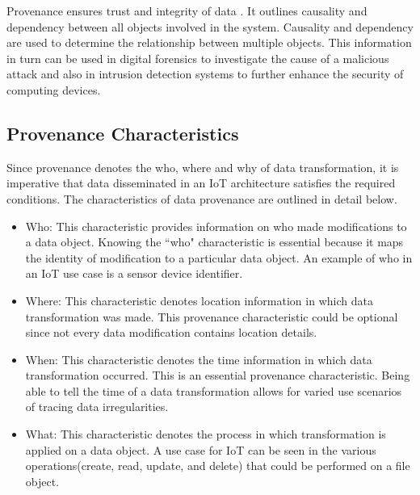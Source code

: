  \par Provenance ensures trust and integrity of data \cite{Bertino2015}. It outlines causality and dependency between all objects involved in the system. Causality and dependency are used to determine the relationship between multiple objects. This information in turn can be used in digital forensics \cite{zawoadfecloud} to investigate the cause of a malicious attack and also in intrusion detection systems to further enhance the security of computing devices. 
 



%
%



\subsection{Provenance Characteristics}

Since provenance denotes the who, where and why of data transformation, it is imperative that data disseminated in an IoT architecture satisfies the required conditions. The characteristics of data provenance are outlined in detail below.


\begin{itemize}

\item Who: This characteristic provides information on who made modifications to a data object. Knowing the ``who" characteristic is essential because it maps the identity of modification to a particular data object. An example of who in an IoT use case is a sensor device identifier.

\item Where: This characteristic denotes location information in which data transformation was made. This provenance characteristic could be optional since not every data modification contains location details.

\item When: This characteristic denotes the time information in which data transformation occurred. This is an essential provenance characteristic. Being able to tell the time of a data transformation allows for varied use scenarios of tracing data irregularities.

\item What: This characteristic denotes the process in which transformation is applied on a data object. A use case for IoT can be seen in the various operations(create, read, update, and delete) that could be performed on a file object.

\end{itemize}


